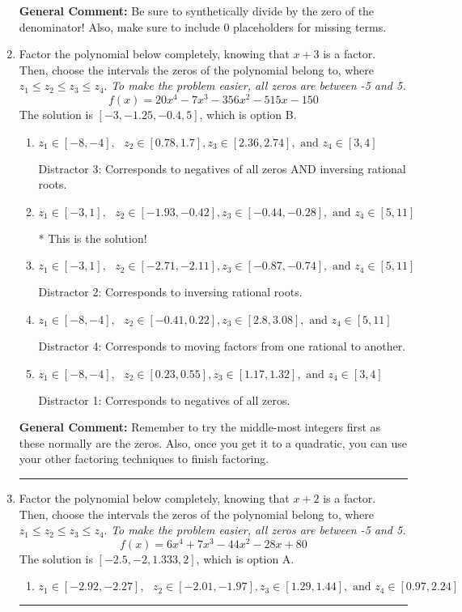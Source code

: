 \documentclass{extbook}[14pt]
\newcommand{\litem}[1]{\item #1

\rule{\textwidth}{0.4pt}}
\begin{document}
\begin{enumerate}
{\textbf{General Comment:} Be sure to synthetically divide by the zero of the denominator! Also, make sure to include 0 placeholders for missing terms.
}
\litem{
Factor the polynomial below completely, knowing that $x + 3$ is a factor. Then, choose the intervals the zeros of the polynomial belong to, where $z_1 \leq z_2 \leq z_3 \leq z_4$. \textit{To make the problem easier, all zeros are between -5 and 5.}
\[ f(x) = 20x^{4} -7 x^{3} -356 x^{2} -515 x -150 \]The solution is \( [-3, -1.25, -0.4, 5] \), which is option B.\begin{enumerate}[label=\Alph*.]
\item \( z_1 \in [-8, -4], \text{   }  z_2 \in [0.78, 1.7], z_3 \in [2.36, 2.74], \text{   and   } z_4 \in [3, 4] \)

 Distractor 3: Corresponds to negatives of all zeros AND inversing rational roots.
\item \( z_1 \in [-3, 1], \text{   }  z_2 \in [-1.93, -0.42], z_3 \in [-0.44, -0.28], \text{   and   } z_4 \in [5, 11] \)

* This is the solution!
\item \( z_1 \in [-3, 1], \text{   }  z_2 \in [-2.71, -2.11], z_3 \in [-0.87, -0.74], \text{   and   } z_4 \in [5, 11] \)

 Distractor 2: Corresponds to inversing rational roots.
\item \( z_1 \in [-8, -4], \text{   }  z_2 \in [-0.41, 0.22], z_3 \in [2.8, 3.08], \text{   and   } z_4 \in [5, 11] \)

 Distractor 4: Corresponds to moving factors from one rational to another.
\item \( z_1 \in [-8, -4], \text{   }  z_2 \in [0.23, 0.55], z_3 \in [1.17, 1.32], \text{   and   } z_4 \in [3, 4] \)

 Distractor 1: Corresponds to negatives of all zeros.
\end{enumerate}

\textbf{General Comment:} Remember to try the middle-most integers first as these normally are the zeros. Also, once you get it to a quadratic, you can use your other factoring techniques to finish factoring.
}
\litem{
Factor the polynomial below completely, knowing that $x + 2$ is a factor. Then, choose the intervals the zeros of the polynomial belong to, where $z_1 \leq z_2 \leq z_3 \leq z_4$. \textit{To make the problem easier, all zeros are between -5 and 5.}
\[ f(x) = 6x^{4} +7 x^{3} -44 x^{2} -28 x + 80 \]The solution is \( [-2.5, -2, 1.333, 2] \), which is option A.\begin{enumerate}[label=\Alph*.]
\item \( z_1 \in [-2.92, -2.27], \text{   }  z_2 \in [-2.01, -1.97], z_3 \in [1.29, 1.44], \text{   and   } z_4 \in [0.97, 2.24] \)


\end{enumerate}}
\end{enumerate}
\end{document}
